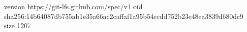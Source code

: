 version https://git-lfs.github.com/spec/v1
oid sha256:14b64087db755ab1e35a66ac2caffaf1a95b54ccdd752b23e48ea3839d680dc9
size 1207
